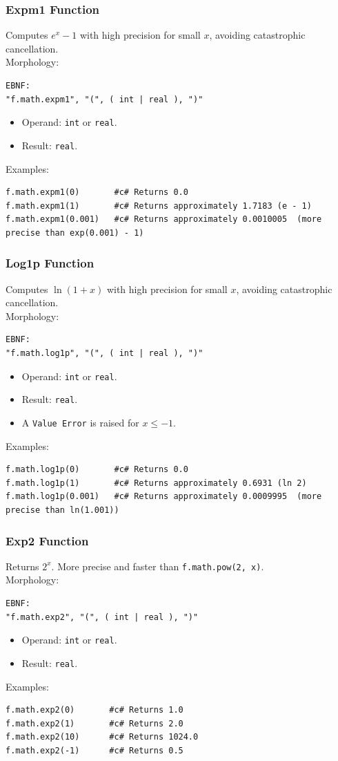\subsubsection{Expm1 Function}
Computes $e^x - 1$ with high precision for small $x$, avoiding catastrophic cancellation. \\
Morphology:
\begin{verbatim}
EBNF:
"f.math.expm1", "(", ( int | real ), ")"
\end{verbatim}
\begin{itemize}
\item Operand: \texttt{int} or \texttt{real}.
\item Result: \texttt{real}.
\end{itemize}
Examples:
\begin{verbatim}
f.math.expm1(0)       #c# Returns 0.0
f.math.expm1(1)       #c# Returns approximately 1.7183 (e - 1)
f.math.expm1(0.001)   #c# Returns approximately 0.0010005  (more precise than exp(0.001) - 1)
\end{verbatim}

\subsubsection{Log1p Function}
Computes $\ln(1 + x)$ with high precision for small $x$, avoiding catastrophic cancellation. \\
Morphology:
\begin{verbatim}
EBNF:
"f.math.log1p", "(", ( int | real ), ")"
\end{verbatim}
\begin{itemize}
\item Operand: \texttt{int} or \texttt{real}.
\item Result: \texttt{real}.
\item A \texttt{Value Error} is raised for $x \leq -1$.
\end{itemize}
Examples:
\begin{verbatim}
f.math.log1p(0)       #c# Returns 0.0
f.math.log1p(1)       #c# Returns approximately 0.6931 (ln 2)
f.math.log1p(0.001)   #c# Returns approximately 0.0009995  (more precise than ln(1.001))
\end{verbatim}

\subsubsection{Exp2 Function}
Returns $2^x$. More precise and faster than \texttt{f.math.pow(2, x)}.\\
Morphology:
\begin{verbatim}
EBNF:
"f.math.exp2", "(", ( int | real ), ")"
\end{verbatim}
\begin{itemize}
\item Operand: \texttt{int} or \texttt{real}.
\item Result: \texttt{real}.
\end{itemize}
Examples:
\begin{verbatim}
f.math.exp2(0)       #c# Returns 1.0
f.math.exp2(1)       #c# Returns 2.0
f.math.exp2(10)      #c# Returns 1024.0
f.math.exp2(-1)      #c# Returns 0.5
\end{verbatim}

